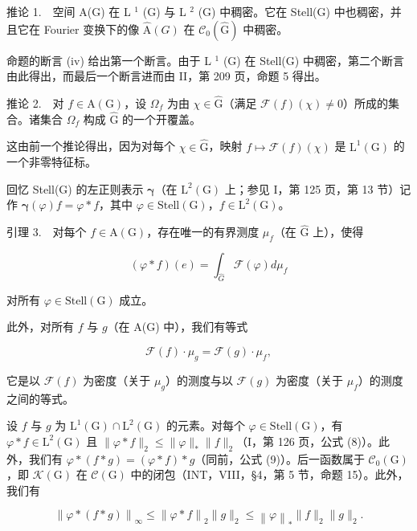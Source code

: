 推论 1.　空间 A(G) 在 L \(^{1}\) (G) 与 L \(^{2}\) (G) 中稠密。它在 Stell(G) 中也稠密，并且它在 Fourier 变换下的像 \(\widehat{\mathrm{A}}(G)\) 在 \(\mathcal{C}_{0}(\widehat{\mathrm{G}})\) 中稠密。

命题的断言 (iv) 给出第一个断言。由于 L \(^{1}\) (G) 在 Stell(G) 中稠密，第二个断言由此得出，而最后一个断言进而由 II，第 209 页，命题 5 得出。

推论 2.　对 \(f \in \mathrm{A}(\mathrm{G})\)，设 \(\Omega_f\) 为由 \(\chi \in \widehat{\mathrm{G}}\)（满足 \(\mathcal{F}(f)(\chi) \neq 0\)）所成的集合。诸集合 \(\Omega_f\) 构成 \(\widehat{\mathrm{G}}\) 的一个开覆盖。

这由前一个推论得出，因为对每个 \(\chi \in \widehat{\mathrm{G}}\)，映射 \(f \mapsto \mathcal{F}(f)(\chi)\) 是 \(\mathrm{L}^1(\mathrm{G})\) 的一个非零特征标。

回忆 Stell(G) 的左正则表示 \(\pmb{\gamma}\)（在 \(\mathrm{L}^2 (\mathrm{G})\) 上；参见 I，第 125 页，第 13 节）记作 \(\pmb{\gamma}(\varphi)f = \varphi *f\)，其中 \(\varphi \in \mathrm{Stell}(\mathrm{G})\)，\(f\in \mathrm{L}^2 (\mathrm{G})\)。

引理 3.　对每个 \(f \in \mathrm{A}(\mathrm{G})\)，存在唯一的有界测度 \(\mu_{f}\)（在 \(\widehat{\mathrm{G}}\) 上），使得

\[
(\varphi * f) (e) = \int_ {\widehat {G}} \mathcal {F} (\varphi) d \mu_ {f}\tag{17}
\]

对所有 \(\varphi\in\mathrm{Stell}(\mathrm{G})\) 成立。

此外，对所有 \(f\) 与 \(g\)（在 A(G) 中），我们有等式

\[
\mathcal {F} (f) \cdot \mu_ {g} = \mathcal {F} (g) \cdot \mu_ {f},\tag{18}
\]

它是以 \(\mathcal{F}(f)\) 为密度（关于 \(\mu_g\)）的测度与以 \(\mathcal{F}(g)\) 为密度（关于 \(\mu_f\)）的测度之间的等式。

设 \(f\) 与 \(g\) 为 \(\mathrm{L}^{1}(\mathrm{G}) \cap \mathrm{L}^{2}(\mathrm{G})\) 的元素。对每个 \(\varphi \in \mathrm{Stell}(\mathrm{G})\)，有 \(\varphi * f \in \mathrm{L}^{2}(\mathrm{G})\) 且 \(\| \varphi * f \|_{2} \leqslant \| \varphi \|_{*} \| f \|_{2}\)（I，第 126 页，公式 (8)）。此外，我们有 \(\varphi * (f * g) = (\varphi * f) * g\)（同前，公式 (9)）。后一函数属于 \(\mathcal{C}_{0}(\mathrm{G})\)，即 \(\mathcal{K}(\mathrm{G})\) 在 \(\mathcal{C}(\mathrm{G})\) 中的闭包（INT，VIII，§4，第 5 节，命题 15）。此外，我们有

\[
\left\| \varphi * (f * g) \right\| _ {\infty} \leqslant \left\| \varphi * f \right\| _ {2} \| g \| _ {2} \leqslant \left\| \varphi \right\| _ {*} \| f \| _ {2} \| g \| _ {2}.
\]

